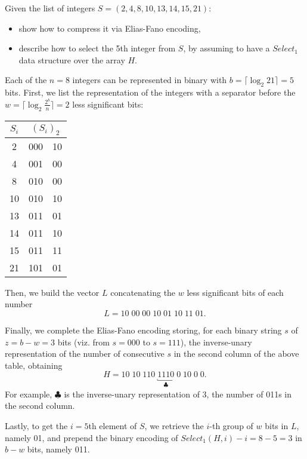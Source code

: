 \exercise

Given the list of integers $S=(2,4,8,10,13,14,15,21)$:
%
\begin{itemize}
  \item show how to compress it via Elias-Fano encoding,
  \item describe how to select the 5th integer from $S$, by assuming to have a $Select_1$ data structure over the array $H$.
\end{itemize}

\solution
\label{09_posting_compression:elias}

Each of the $n=8$ integers can be represented in binary with $b=\lceil\log_2
21\rceil=5$ bits. First, we list the representation of the integers with a
separator before the $w=\lceil\log_2\frac{2^b}{n}\rceil=2$ less significant
bits:
%
\begin{center}
  \begin{tabular}{ c | r | l }
    $S_i$ & \multicolumn{2}{c}{$(S_i)_2$} \\ \hline
     2 & 000 & 10 \\
     4 & 001 & 00 \\
     8 & 010 & 00 \\
    10 & 010 & 10 \\
    13 & 011 & 01 \\
    14 & 011 & 10 \\
    15 & 011 & 11 \\
    21 & 101 & 01
  \end{tabular}
\end{center}
%
Then, we build the vector $L$ concatenating the $w$ less significant bits of
each number
%
$$L = 10\; 00\; 00\; 10\; 01\; 10\; 11\; 01.$$

Finally, we complete the Elias-Fano encoding storing, for each binary string $s$
of $z = b-w = 3$ bits (viz. from $s=000$ to $s=111$), the inverse-unary
representation of the number of consecutive $s$ in the second column of the
above table, obtaining
%
$$H=10\;10\;110\;\underbracket{1110}_{\clubsuit}\;0\;10\;0\;0.$$
%
For example, $\clubsuit$ is the inverse-unary representation of 3, the number of
011s in the second column.

Lastly, to get the $i=5$th element of $S$, we retrieve the $i$-th group of $w$
bits in $L$, namely 01, and prepend the binary encoding of $Select_1(H,
i)-i=8-5=3$ in $b-w$ bits, namely 011.
